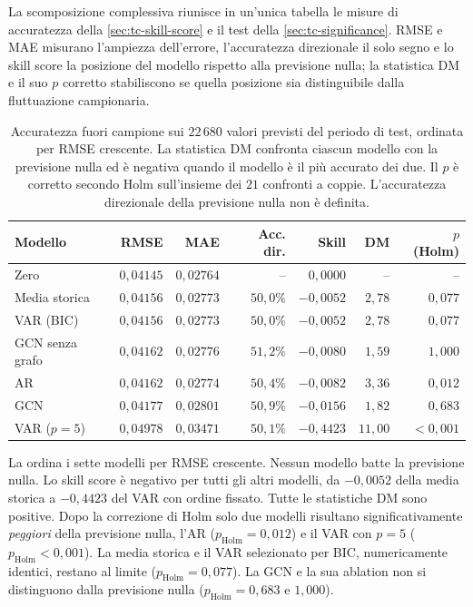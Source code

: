 La scomposizione complessiva riunisce in un'unica tabella le misure di accuratezza della \cref{sec:tc-skill-score} e il test della \cref{sec:tc-significance}. RMSE e MAE misurano l'ampiezza dell'errore, l'accuratezza direzionale il solo segno e lo skill score la posizione del modello rispetto alla previsione nulla; la statistica DM e il suo $p$ corretto stabiliscono se quella posizione sia distinguibile dalla fluttuazione campionaria.

\begin{table}[H]
\centering
\caption[Confronto predittivo tra i modelli]{Accuratezza fuori campione sui $22\,680$ valori previsti del periodo di test, ordinata per RMSE crescente. La statistica DM confronta ciascun modello con la previsione nulla ed è negativa quando il modello è il più accurato dei due. Il $p$ è corretto secondo Holm sull'insieme dei $21$ confronti a coppie. L'accuratezza direzionale della previsione nulla non è definita.}
\label{tab:tc-results-main}
\small
\begin{tabular}{@{}lrrrrrr@{}}
\toprule
\textbf{Modello} & \textbf{RMSE} & \textbf{MAE} & \textbf{Acc. dir.} & \textbf{Skill} & \textbf{DM} & \textbf{$p$ (Holm)} \\
\midrule
Zero & $0{,}04145$ & $0{,}02764$ & -- & $0{,}0000$ & -- & -- \\
Media storica & $0{,}04156$ & $0{,}02773$ & $50{,}0\%$ & $-0{,}0052$ & $2{,}78$ & $0{,}077$ \\
VAR (BIC) & $0{,}04156$ & $0{,}02773$ & $50{,}0\%$ & $-0{,}0052$ & $2{,}78$ & $0{,}077$ \\
GCN senza grafo & $0{,}04162$ & $0{,}02776$ & $51{,}2\%$ & $-0{,}0080$ & $1{,}59$ & $1{,}000$ \\
AR & $0{,}04162$ & $0{,}02774$ & $50{,}4\%$ & $-0{,}0082$ & $3{,}36$ & $0{,}012$ \\
GCN & $0{,}04177$ & $0{,}02801$ & $50{,}9\%$ & $-0{,}0156$ & $1{,}82$ & $0{,}683$ \\
VAR ($p=5$) & $0{,}04978$ & $0{,}03471$ & $50{,}1\%$ & $-0{,}4423$ & $11{,}00$ & $<0{,}001$ \\
\bottomrule
\end{tabular}
\end{table}

La  ordina i sette modelli per RMSE crescente. Nessun modello batte la previsione nulla. Lo skill score è negativo per tutti gli altri modelli, da $-0{,}0052$ della media storica a $-0{,}4423$ del VAR con ordine fissato. Tutte le statistiche DM sono positive. Dopo la correzione di Holm solo due modelli risultano significativamente \emph{peggiori} della previsione nulla, l'AR ($p_{\mathrm{Holm}}=0{,}012$) e il VAR con $p=5$ ($p_{\mathrm{Holm}}<0{,}001$). La media storica e il VAR selezionato per BIC, numericamente identici, restano al limite ($p_{\mathrm{Holm}}=0{,}077$). La GCN e la sua ablation non si distinguono dalla previsione nulla ($p_{\mathrm{Holm}}=0{,}683$ e $1{,}000$).

